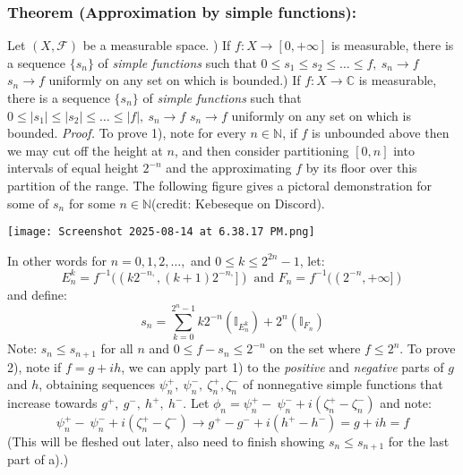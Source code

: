 \documentclass{article}
\begin{document}
\subsubsection{Theorem (Approximation by simple functions):}
Let $(X, \mathcal{F})$ be a measurable space. \newline {}) If  $f:X \to [0,+\infty]$ is measurable, there is a sequence $ \{s_n\}$ of \emph{simple functions} such that $0 \leq s_1 \leq s_2 \leq\ldots \leq f, \ s_n\to f$  $s_n\to f$ uniformly on any set on which is bounded.\newline {}) If  $f:X \to \mathbb{C}$ is measurable, there is a sequence $ \{s_n\}$ of \emph{simple functions} such that $0 \leq |s_1| \leq |s_2|\leq\ldots \leq |f|, \ s_n\to f$  $s_n\to f$ uniformly on any set on which is bounded.\newline \newline
\textit{Proof.}\newline \newline
To prove 1), note for every $n \in \mathbb{N}$, if $f$ is unbounded above then we may cut off the height at $n$, and then consider partitioning $[0,n]$ into intervals of equal height $2^{-n}$ and the approximating $f$ by its floor over this partition of the range. The following figure gives a pictoral demonstration for some of $s_n$ for some $n \in \mathbb{N}$(credit: Kebeseque on Discord). 
\begin{center}
    \texttt{[image: Screenshot 2025-08-14 at 6.38.17 PM.png]}
    \label{fig:placeholder}
\end{center} 
In other words for $n=0,1,2,\ldots,$ and $0\leq k\leq2^{2n}-1$, let:
\[
E^k_n=f^{-1}((k2^{-n,},(k+1)2^{-n,}]) \text{ and } F_n=f^{-1}((2^{-n},+\infty])
\] and define:
\[
s_n=\sum_{k=0}^{2^{n}-1}k2^{-n}(\mathbb{I}_{E_n^k})+2^n(\mathbb{I}_{F_n})
\]
Note: $s_n\leq s_{n+1}$ for all $n$ and $0 \leq f-s_n\leq2^{-n}$ on the set where $f \leq 2^n$.
\newline \newline
To prove 2), note if $f=g+ih$, we can apply part 1) to the \emph{positive} and \emph{negative} parts of $g$ and $h$, obtaining sequences $\psi^+_n, \ \psi^-_n, \ \zeta^+_n, \zeta^-_n$ of nonnegative simple functions that increase towards $g^+, \ g^-, \ h^+, \ h^-$. Let $\phi_n= \psi^+_n-\ \psi^-_n+ i( \zeta^+_n- \zeta^-_n)$ and note:
\[
\psi^+_n-\ \psi^-_n+ i( \zeta^+_n- \zeta^-)\to g^+-g^-+i(h^+-h^-)=g+ih=f
\]
(This will be fleshed out later, also need to finish showing $s_n\leq s_{n+1}$ for the last part of a).)
\end{document}
